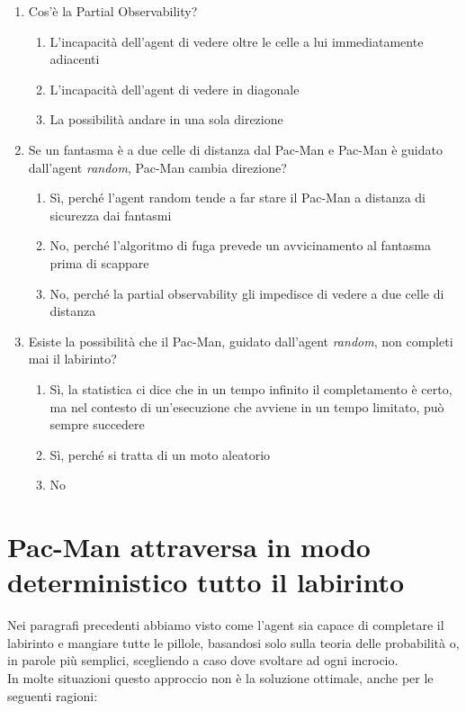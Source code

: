 \documentclass[8pt]{book}
\begin{document}
\begin{enumerate}
\item Cos'è la Partial Observability?
\begin{enumerate}
\def\labelenumi{\alph{enumi}.}
\item
  L'incapacità dell'agent di vedere oltre le celle a lui immediatamente adiacenti
\item
  L'incapacità dell'agent di vedere in diagonale
\item
  La possibilità andare in una sola direzione
\end{enumerate}

\item Se un fantasma è a due celle di distanza dal Pac-Man e Pac-Man è guidato dall'agent \emph{random}, Pac-Man cambia direzione?

\begin{enumerate}
\def\labelenumi{\alph{enumi}.}
\item
  Sì, perché l'agent random tende a far stare il Pac-Man a distanza di sicurezza dai fantasmi
\item
  No, perché l'algoritmo di fuga prevede un avvicinamento al fantasma prima di scappare
\item
  No, perché la partial observability gli impedisce di vedere a due celle di distanza
\end{enumerate}

\item Esiste la possibilità che il Pac-Man, guidato dall'agent \emph{random}, non completi mai il labirinto?

\begin{enumerate}
\def\labelenumi{\alph{enumi}.}
\item
  Sì, la statistica ci dice che in un tempo infinito il completamento è certo, ma nel contesto di un'esecuzione che avviene in un tempo limitato, può sempre succedere
\item
  Sì, perché si tratta di un moto aleatorio
\item
  No
\end{enumerate}
\end{enumerate}


\chapter[Attraversamento deterministico]{Pac-Man attraversa in modo deterministico tutto il labirinto}

Nei paragrafi precedenti abbiamo visto come l'agent sia capace di completare il labirinto e mangiare tutte le pillole, basandosi solo sulla teoria delle probabilità o, in parole più semplici, scegliendo a caso dove svoltare ad ogni incrocio.\\
In molte situazioni questo approccio non è la soluzione ottimale, anche per le seguenti ragioni:
\end{document}
